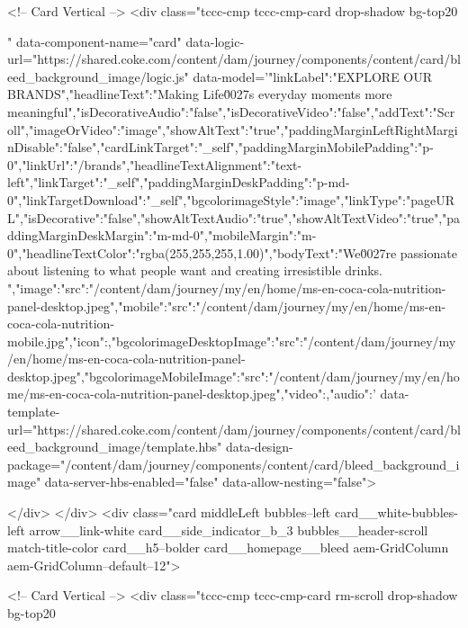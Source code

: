   



<!-- Card Vertical -->
<div class="tccc-cmp tccc-cmp-card drop-shadow bg-top20 
  
  " data-component-name="card" data-logic-url="https://shared.coke.com/content/dam/journey/components/content/card/bleed_background_image/logic.js" data-model='{"linkLabel":"EXPLORE OUR BRANDS","headlineText":"Making Life\u0027s everyday moments more meaningful","isDecorativeAudio":"false","isDecorativeVideo":"false","addText":"Scroll","imageOrVideo":"image","showAltText":"true","paddingMarginLeftRightMarginDisable":"false","cardLinkTarget":"_self","paddingMarginMobilePadding":"p-0","linkUrl":"/brands","headlineTextAlignment":"text-left","linkTarget":"_self","paddingMarginDeskPadding":"p-md-0","linkTargetDownload":"_self","bgcolorimageStyle":"image","linkType":"pageURL","isDecorative":"false","showAltTextAudio":"true","showAltTextVideo":"true","paddingMarginDeskMargin":"m-md-0","mobileMargin":"m-0","headlineTextColor":"rgba(255,255,255,1.00)","bodyText":"We\u0027re passionate about listening to what people want and creating irresistible drinks. ","image":{"src":"/content/dam/journey/my/en/home/ms-en-coca-cola-nutrition-panel-desktop.jpeg"},"mobile":{"src":"/content/dam/journey/my/en/home/ms-en-coca-cola-nutrition-mobile.jpg"},"icon":{},"bgcolorimageDesktopImage":{"src":"/content/dam/journey/my/en/home/ms-en-coca-cola-nutrition-panel-desktop.jpeg"},"bgcolorimageMobileImage":{"src":"/content/dam/journey/my/en/home/ms-en-coca-cola-nutrition-panel-desktop.jpeg"},"video":{},"audio":{}}' data-template-url="https://shared.coke.com/content/dam/journey/components/content/card/bleed_background_image/template.hbs" data-design-package="/content/dam/journey/components/content/card/bleed_background_image" data-server-hbs-enabled="false" data-allow-nesting="false">
  
  
</div>
</div>
<div class="card middleLeft bubbles--left card__white-bubbles-left arrow__link-white card__side_indicator_b_3 bubbles__header-scroll match-title-color card__h5--bolder card__homepage__bleed aem-GridColumn aem-GridColumn--default--12">
    




  



<!-- Card Vertical -->
<div class="tccc-cmp tccc-cmp-card rm-scroll drop-shadow bg-top20 
  
